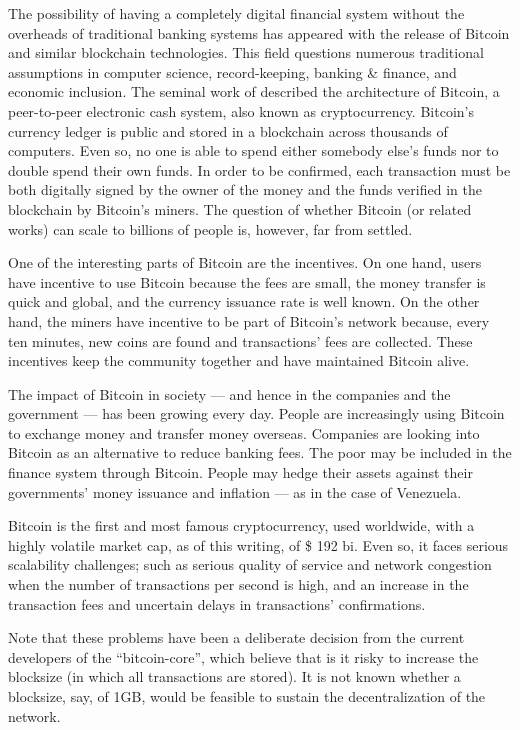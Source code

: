 The possibility of having a completely digital financial system without the overheads of traditional banking systems has appeared with the release of Bitcoin and similar blockchain technologies.  This field questions numerous traditional assumptions in computer science, record-keeping, banking \& finance, and economic inclusion. The seminal work of \citet{nakamoto2008bitcoin} described the architecture of Bitcoin, a peer-to-peer electronic cash system, also known as cryptocurrency. Bitcoin's currency ledger is public and stored in a blockchain across thousands of computers. Even so, no one is able to spend either somebody else's funds nor to double spend their own funds. In order to be confirmed, each transaction must be both digitally signed by the owner of the money and the funds verified in the blockchain by Bitcoin's miners. The question of whether Bitcoin (or related works) can scale to billions of people is, however, far from settled.

One of the interesting parts of Bitcoin are the incentives. On one hand, users have incentive to use Bitcoin because the fees are small, the money transfer is quick and global, and the currency issuance rate is well known. On the other hand, the miners have incentive to be part of Bitcoin's network because, every ten minutes, new coins are found and transactions' fees are collected. These incentives keep the community together and have maintained Bitcoin alive.

The impact of Bitcoin in society --- and hence in the companies and the government --- has been growing every day. People are increasingly using Bitcoin to exchange money and transfer money overseas. Companies are looking into Bitcoin as an alternative to reduce banking fees. The poor may be included in the finance system through Bitcoin. People may hedge their assets against their governments' money issuance and inflation --- as in the case of Venezuela.

Bitcoin is the first and most famous cryptocurrency, used worldwide, with a highly volatile market cap, as of this writing, of \$ 192 bi. Even so, it faces serious scalability challenges; such as serious quality of service and network congestion when the number of transactions per second is high, and an increase in the transaction fees and uncertain delays in transactions' confirmations.

Note that these problems have been a deliberate decision from the current developers of the ``bitcoin-core'', which believe that is it risky to increase the blocksize (in which all transactions are stored).  It is not known whether a blocksize, say, of 1GB, would be feasible to sustain the decentralization of the network.

